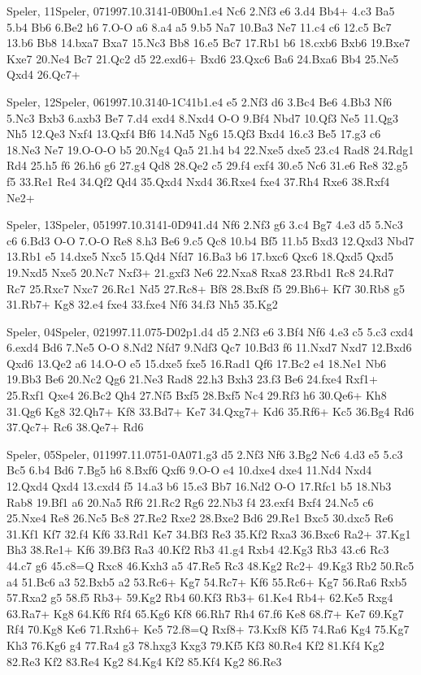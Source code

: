 \documentclass[twocolumn,a4paper,10pt]{report}
\begin{document}
\begin{chessgame}{Speler, 11}{Speler, 07}{1997.10.31}{4}{1-0}{B00n}{1.e4 Nc6 2.Nf3 e6 3.d4 Bb4+ 4.c3 Ba5 5.b4 Bb6 6.Be2 h6 7.O-O a6 8.a4 a5 9.b5 Na7 10.Ba3 Ne7 11.c4 c6 12.c5 Bc7 13.b6 Bb8 14.bxa7 Bxa7 15.Nc3 Bb8 16.e5 Bc7 17.Rb1 b6 18.cxb6 Bxb6 19.Bxe7 Kxe7 20.Ne4 Bc7 21.Qc2 d5 22.exd6+ Bxd6 23.Qxc6 Ba6 24.Bxa6 Bb4 25.Ne5 Qxd4 26.Qc7+}\end{chessgame}
\begin{chessgame}{Speler, 12}{Speler, 06}{1997.10.31}{4}{0-1}{C41b}{1.e4 e5 2.Nf3 d6 3.Bc4 Be6 4.Bb3 Nf6 5.Nc3 Bxb3 6.axb3 Be7 7.d4 exd4 8.Nxd4 O-O 9.Bf4 Nbd7 10.Qf3 Ne5 11.Qg3 Nh5 12.Qe3 Nxf4 13.Qxf4 Bf6 14.Nd5 Ng6 15.Qf3 Bxd4 16.c3 Be5 17.g3 c6 18.Ne3 Ne7 19.O-O-O b5 20.Ng4 Qa5 21.h4 b4 22.Nxe5 dxe5 23.c4 Rad8 24.Rdg1 Rd4 25.h5 f6 26.h6 g6 27.g4 Qd8 28.Qe2 c5 29.f4 exf4 30.e5 Nc6 31.e6 Re8 32.g5 f5 33.Re1 Re4 34.Qf2 Qd4 35.Qxd4 Nxd4 36.Rxe4 fxe4 37.Rh4 Rxe6 38.Rxf4 Ne2+}\end{chessgame}
\begin{chessgame}{Speler, 13}{Speler, 05}{1997.10.31}{4}{1-0}{D94}{1.d4 Nf6 2.Nf3 g6 3.c4 Bg7 4.e3 d5 5.Nc3 c6 6.Bd3 O-O 7.O-O Re8 8.h3 Be6 9.c5 Qc8 10.b4 Bf5 11.b5 Bxd3 12.Qxd3 Nbd7 13.Rb1 e5 14.dxe5 Nxc5 15.Qd4 Nfd7 16.Ba3 b6 17.bxc6 Qxc6 18.Qxd5 Qxd5 19.Nxd5 Nxe5 20.Nc7 Nxf3+ 21.gxf3 Ne6 22.Nxa8 Rxa8 23.Rbd1 Rc8 24.Rd7 Rc7 25.Rxc7 Nxc7 26.Rc1 Nd5 27.Rc8+ Bf8 28.Bxf8 f5 29.Bh6+ Kf7 30.Rb8 g5 31.Rb7+ Kg8 32.e4 fxe4 33.fxe4 Nf6 34.f3 Nh5 35.Kg2}\end{chessgame}
\begin{chessgame}{Speler, 04}{Speler, 02}{1997.11.07}{5}{\textonehalf-\textonehalf}{D02p}{1.d4 d5 2.Nf3 e6 3.Bf4 Nf6 4.e3 c5 5.c3 cxd4 6.exd4 Bd6 7.Ne5 O-O 8.Nd2 Nfd7 9.Ndf3 Qc7 10.Bd3 f6 11.Nxd7 Nxd7 12.Bxd6 Qxd6 13.Qe2 a6 14.O-O e5 15.dxe5 fxe5 16.Rad1 Qf6 17.Bc2 e4 18.Ne1 Nb6 19.Bb3 Be6 20.Nc2 Qg6 21.Ne3 Rad8 22.h3 Bxh3 23.f3 Be6 24.fxe4 Rxf1+ 25.Rxf1 Qxe4 26.Bc2 Qh4 27.Nf5 Bxf5 28.Bxf5 Nc4 29.Rf3 h6 30.Qe6+ Kh8 31.Qg6 Kg8 32.Qh7+ Kf8 33.Bd7+ Ke7 34.Qxg7+ Kd6 35.Rf6+ Kc5 36.Bg4 Rd6 37.Qc7+ Rc6 38.Qe7+ Rd6}\end{chessgame}
\begin{chessgame}{Speler, 05}{Speler, 01}{1997.11.07}{5}{1-0}{A07}{1.g3 d5 2.Nf3 Nf6 3.Bg2 Nc6 4.d3 e5 5.c3 Bc5 6.b4 Bd6 7.Bg5 h6 8.Bxf6 Qxf6 9.O-O e4 10.dxe4 dxe4 11.Nd4 Nxd4 12.Qxd4 Qxd4 13.cxd4 f5 14.a3 b6 15.e3 Bb7 16.Nd2 O-O 17.Rfc1 b5 18.Nb3 Rab8 19.Bf1 a6 20.Na5 Rf6 21.Rc2 Rg6 22.Nb3 f4 23.exf4 Bxf4 24.Nc5 c6 25.Nxe4 Re8 26.Nc5 Bc8 27.Re2 Rxe2 28.Bxe2 Bd6 29.Re1 Bxc5 30.dxc5 Re6 31.Kf1 Kf7 32.f4 Kf6 33.Rd1 Ke7 34.Bf3 Re3 35.Kf2 Rxa3 36.Bxc6 Ra2+ 37.Kg1 Bh3 38.Re1+ Kf6 39.Bf3 Ra3 40.Kf2 Rb3 41.g4 Rxb4 42.Kg3 Rb3 43.c6 Rc3 44.c7 g6 45.c8=Q Rxc8 46.Kxh3 a5 47.Re5 Rc3 48.Kg2 Rc2+ 49.Kg3 Rb2 50.Rc5 a4 51.Bc6 a3 52.Bxb5 a2 53.Rc6+ Kg7 54.Rc7+ Kf6 55.Rc6+ Kg7 56.Ra6 Rxb5 57.Rxa2 g5 58.f5 Rb3+ 59.Kg2 Rb4 60.Kf3 Rb3+ 61.Ke4 Rb4+ 62.Ke5 Rxg4 63.Ra7+ Kg8 64.Kf6 Rf4 65.Kg6 Kf8 66.Rh7 Rh4 67.f6 Ke8 68.f7+ Ke7 69.Kg7 Rf4 70.Kg8 Ke6 71.Rxh6+ Ke5 72.f8=Q Rxf8+ 73.Kxf8 Kf5 74.Ra6 Kg4 75.Kg7 Kh3 76.Kg6 g4 77.Ra4 g3 78.hxg3 Kxg3 79.Kf5 Kf3 80.Re4 Kf2 81.Kf4 Kg2 82.Re3 Kf2 83.Re4 Kg2 84.Kg4 Kf2 85.Kf4 Kg2 86.Re3}\end{chessgame}
\end{document}
